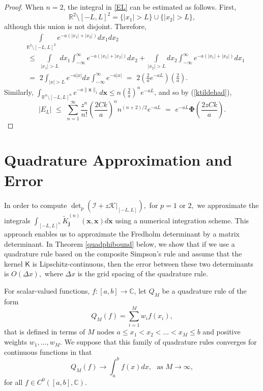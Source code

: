\documentclass{birkjour}
\theoremstyle{definition}
\theoremstyle{remark}
\numberwithin{equation}{section}
\begin{document}
\begin{proof}
When $n=2$, the integral in \eqref{EL} can be estimated as follows. First,
\begin{equation}
    \mathbb{R}^2 \setminus [-L,L]^2 = \{ |x_1| > L\} \cup \{|x_2|>L\},
\end{equation} although this union is not disjoint. Therefore,
\begin{align}
    &\int\limits_{\mathbb{R}^2 \setminus [-L,L]^2} 
     e^{-a(|x_1| + |x_2|)} dx_1 dx_2 
     \nonumber
     \\
     &\,\,\leq\,\,
   \int\limits_{|x_1|>L} dx_1  \int_{-\infty}^{\infty} e^{-a (|x_1| + |x_2|)} dx_2 +
   \int\limits_{|x_2|>L}dx_2\! \int_{-\infty}^{\infty}e^{-a (|x_1| + |x_2|)} dx_1
   \nonumber
   \\
   &\,\, =\,\, 2 \int_{|x|>L} e^{-a|x|}dx   \int_{-\infty}^\infty e^{-a|x|}
   \,\,=\,\,  2 \left( \frac{2}{a} e^{-a L}\right)\left( \frac{2}{a} \right).
\end{align}
Similarly, 
$\int_{\mathbb{R}^n\setminus [-L,L]^n} e^{-a \|\mathbf{x}\|_1} d\mathbf{x} \leq n \left(\frac{2}{a}\right)^n e^{-a L}$,
and so by (\ref{ktildehad}), 
\begin{equation} 
    |E_L| \,\,\leq\,\, \sum_{n=1}^{\infty} \frac{z^n}{n!} \left(\frac{2Ck}{a}\right)^n n^{(n+2)/2} e^{-aL}    \,\,=\,\, e^{- a L} \boldsymbol{\Phi}\left( \frac{2zCk}{a}\right).
\end{equation}
\end{proof}



\section{Quadrature Approximation and Error}\label{quadsection}

In order to compute $\det_p(\mathcal{I} + z\mathcal{K}|_{[-L, L]}),$ for $p=1$ or $2,$ we approximate the integrals $\int_{[-L,L]^n} \widetilde{K}^{(n)}_{\mathbf{j}}(\mathbf x, \mathbf x) d\mathbf{x}$ using a numerical integration scheme. 
This approach enables us to approximate the Fredholm determinant by a 
matrix determinant.
 In Theorem \ref{quadphibound} below, we show that if we use a quadrature rule based on the composite Simpson's rule and 
assume that the kernel $\textsf{K}$ is Lipschitz-continuous,  then the error
between these two determinants is ${O}(\Delta x),$ where $\Delta x$ is the grid spacing
of the quadrature rule.



For scalar-valued functions, $f :[a,b]\to\mathbb{C}$, let
$Q_M$ be a quadrature rule   of the form~\cite{atkinson2008introduction}
\begin{equation}
    Q_M(f) = \sum_{i=1}^M w_i f(x_i),
\end{equation}
that is defined in terms of $M$ nodes $a \leq x_1 < x_2 < \dots < x_M \leq b$ and positive weights $w_1, \dots, w_M.$ We suppose that this family of quadrature rules
converges for continuous functions in that 
\begin{equation}
    Q_M(f) \to \int_a^b f(x)dx, \,\, \text{ as } M \to \infty,
\end{equation}
for all $f \in C^0([a,b],\mathbb{C})$.
\end{document}
